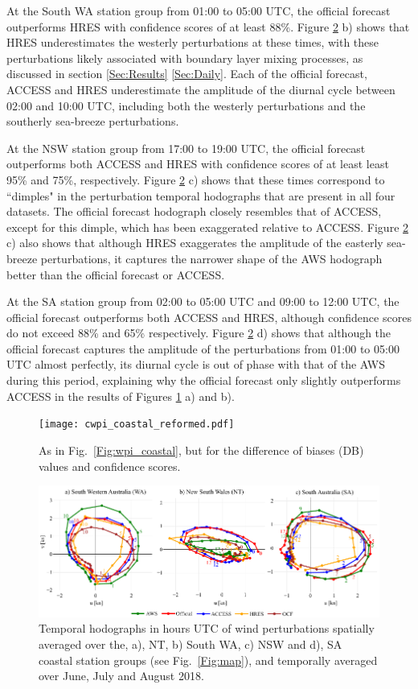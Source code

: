 \documentclass[twocol]{ametsoc}
\begin{document}
At the South WA station group from 01:00 to 05:00 UTC, the official forecast outperforms HRES with confidence scores of at least $88\%$. Figure \ref{Fig:clim_hodo} b) shows that HRES underestimates the westerly perturbations at these times, with these perturbations likely associated with boundary layer mixing processes, as discussed in section \ref{Sec:Results} \ref{Sec:Daily}. Each of the official forecast, ACCESS and HRES underestimate the amplitude of the diurnal cycle between 02:00 and 10:00 UTC, including both the westerly perturbations and the southerly sea-breeze perturbations. 

At the NSW station group from 17:00 to 19:00 UTC, the official forecast outperforms both ACCESS and HRES with confidence scores of at least least 95\% and 75\%, respectively. Figure \ref{Fig:clim_hodo} c) shows that these times correspond to ``dimples" in the perturbation temporal hodographs that are present in all four datasets. The official forecast hodograph closely resembles that of ACCESS, except for this dimple, which has been exaggerated relative to ACCESS. Figure \ref{Fig:clim_hodo} c) also shows that although HRES exaggerates the amplitude of the easterly sea-breeze perturbations, it captures the narrower shape of the AWS hodograph better than the official forecast or ACCESS.

At the SA station group from 02:00 to 05:00 UTC and 09:00 to 12:00 UTC, the official forecast outperforms both ACCESS and HRES, although confidence scores do not exceed 88\% and 65\% respectively. Figure \ref{Fig:clim_hodo} d) shows that although the official forecast captures the amplitude of the perturbations from 01:00 to 05:00 UTC almost perfectly, its diurnal cycle is out of phase with that of the AWS during this period, explaining why the official forecast only slightly outperforms ACCESS in the results of Figures \ref{Fig:cwpi_coastal} a) and b).

\begin{figure}
\centering
\texttt{[image: cwpi\_coastal\_reformed.pdf]}
\caption{As in Fig.~\ref{Fig:wpi_coastal}, but for the difference of biases (DB) values and confidence scores.}
\label{Fig:cwpi_coastal}
\end{figure}

\begin{figure}
\centering
\includegraphics[width=39pc]{clim_hodo_alt.pdf}
\caption{Temporal hodographs in hours UTC of wind perturbations spatially averaged over the, a), NT, b) South WA, c) NSW and d), SA coastal station groups (see Fig.~\ref{Fig:map}), and temporally averaged over June, July and August 2018.}
\label{Fig:clim_hodo}
\end{figure}
\end{document}
